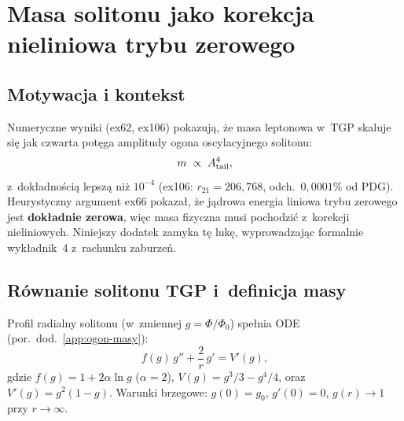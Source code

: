 
\section{Masa solitonu jako korekcja nieliniowa trybu zerowego}%
\label{app:zero-mode-A4}

\subsection{Motywacja i kontekst}

Numeryczne wyniki (ex62, ex106) pokazuj\k{a}, \.ze masa leptonowa
w~TGP skaluje si\k{e} jak czwarta pot\k{e}ga amplitudy ogona
oscylacyjnego solitonu:
\begin{equation}\label{eq:R-mass-scaling}
  m \;\propto\; A_{\rm tail}^4,
\end{equation}
z~dok\l{}adno\'sci\k{a} lepsz\k{a} ni\.z $10^{-4}$ (ex106: $r_{21} = 206{,}768$,
odch.~$0{,}0001\%$ od PDG). Heurystyczny argument ex66 pokaza\l{},
\.ze jądrowa energia liniowa trybu zerowego jest \textbf{dok\l{}adnie
zerowa}, wi\k{e}c masa fizyczna
musi pochodzi\'c z~korekcji nieliniowych. Niniejszy dodatek
zamyka t\k{e} luk\k{e}, wyprowadzaj\k{a}c formalnie
wyk\l{}adnik~4 z~rachunku zaburze\'n.

\medskip
\noindent{}
\medskip

\subsection{R\'ownanie solitonu TGP i~definicja masy}

Profil radialny solitonu (w~zmiennej $g = \Phi/\Phi_0$)
spe\l{}nia ODE (por.\ dod.~\ref{app:ogon-masy}):
\begin{equation}\label{eq:soliton-ode}
  f(g)\,g'' + \frac{2}{r}\,g' = V'(g),
\end{equation}
gdzie $f(g) = 1 + 2\alpha\ln g$ ($\alpha = 2$),
$V(g) = g^3/3 - g^4/4$, oraz $V'(g) = g^2(1-g)$.
Warunki brzegowe: $g(0) = g_0$, $g'(0) = 0$,
$g(r) \to 1$ przy $r \to \infty$.

